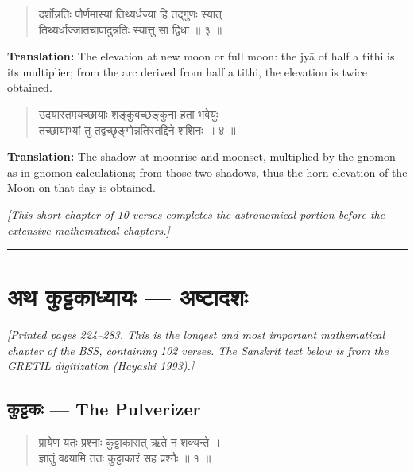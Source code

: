 \documentclass[11pt,a4paper]{article}
\newcommand{\longline}{\noindent\rule{\textwidth}{0.4pt}}
\newcommand{\cnote}[1]{\textcolor{notecolor}{\textit{#1}}}
\newcommand{\dev}[1]{{\devanagarifont #1}}
\newcommand{\dsec}[1]{\section*{\dev{#1}}}
\newenvironment{shloka}{\begin{verse}\devanagarifont\large}{\end{verse}}
\begin{document}
\vspace{0.3cm}

\begin{shloka}
दर्शोन्नतिः पौर्णमास्यां तिथ्यर्धज्या हि तद्गुणः स्यात् \\
तिथ्यर्धाज्जातचापादुन्नतिः स्यात्तु सा द्विधा ॥ ३ ॥
\end{shloka}

\textbf{Translation:}\quad
The elevation at new moon or full moon: the jyā of half a tithi is its
multiplier; from the arc derived from half a tithi, the elevation
is twice obtained.

\vspace{0.3cm}

\begin{shloka}
उदयास्तमयच्छायाः शङ्कुवच्छङ्कुना हता भवेयुः \\
तच्छायाभ्यां तु तद्वच्छृङ्गोन्नतिस्तद्दिने शशिनः ॥ ४ ॥
\end{shloka}

\textbf{Translation:}\quad
The shadow at moonrise and moonset, multiplied by the gnomon as in
gnomon calculations; from those two shadows, thus the horn-elevation
of the Moon on that day is obtained.

\vspace{0.3cm}
\cnote{[This short chapter of 10 verses completes the astronomical
portion before the extensive mathematical chapters.]}

\longline
\newpage

\dsec{अथ कुट्टकाध्यायः — अष्टादशः}

\cnote{[Printed pages 224–283. This is the longest and most important
mathematical chapter of the BSS, containing 102 verses. The Sanskrit
text below is from the GRETIL digitization (Hayashi 1993).]}

\vspace{0.5cm}

\subsection*{\dev{कुट्टकः — The Pulverizer}}

\begin{shloka}
प्रायेण यतः प्रश्नाः कुट्टाकारात् ऋते न शक्यन्ते ।\\
ज्ञातुं वक्ष्यामि ततः कुट्टाकारं सह प्रश्नैः ॥ १ ॥
\end{shloka}
\end{document}
